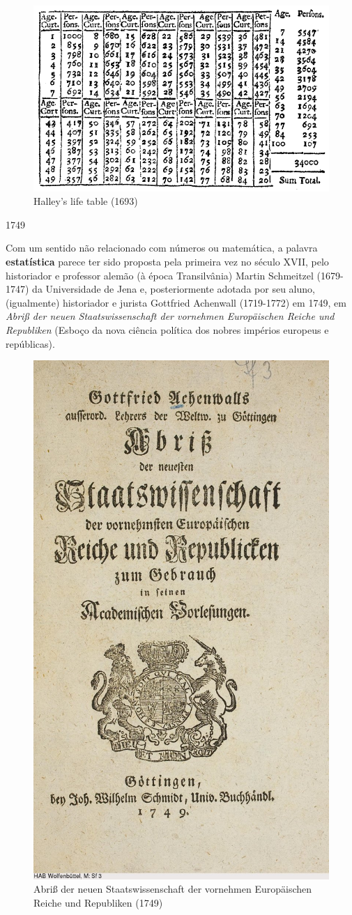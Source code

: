 \documentclass[
]{book}
\theoremstyle{definition}
\theoremstyle{definition}
\theoremstyle{definition}
\theoremstyle{definition}
\theoremstyle{remark}
\begin{document}
\begin{figure}

{\centering \includegraphics[width=0.5\linewidth]{images/halley} 

}

\caption{Halley’s life table (1693)}\label{fig:unnamed-chunk-5}
\end{figure}

1749

Com um sentido não relacionado com números ou matemática, a palavra \textbf{estatística} parece ter sido proposta pela primeira vez no século XVII, pelo historiador e professor alemão (à época Transilvânia) Martin Schmeitzel (1679-1747) da Universidade de Jena e, posteriormente adotada por seu aluno, (igualmente) historiador e jurista Gottfried Achenwall (1719-1772) em 1749, em \emph{Abriß der neuen Staatswissenschaft der vornehmen Europäischen Reiche und Republiken} (Esboço da nova ciência política dos nobres impérios europeus e repúblicas).

\begin{figure}

{\centering \includegraphics[width=0.5\linewidth]{images/gottfried} 

}

\caption{Abriß der neuen Staatswissenschaft der vornehmen Europäischen Reiche und Republiken (1749)}\label{fig:unnamed-chunk-6}
\end{figure}
\end{document}
